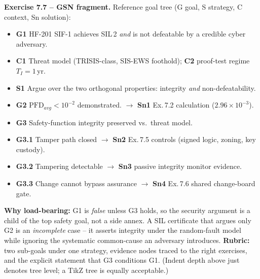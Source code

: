 \documentclass[11pt,a4paper]{article}
\begin{document}
\begin{solutionbox}
\textbf{Exercise 7.7 -- GSN fragment.}
Reference goal tree (G goal, S strategy, C context, Sn solution):
\begin{itemize}\setlength{\itemsep}{1pt}
  \item \textbf{G1} HF-201 SIF-1 achieves SIL\,2 \emph{and} is not defeatable
        by a credible cyber adversary.
  \item \quad\textbf{C1} Threat model (TRISIS-class, SIS-EWS foothold);
        \textbf{C2} proof-test regime $T_I=1\,$yr.
  \item \quad\textbf{S1} Argue over the two orthogonal properties: integrity
        \emph{and} non-defeatability.
  \item \qquad\textbf{G2} $\mathrm{PFD}_{avg}<10^{-2}$ demonstrated.
        $\to$ \textbf{Sn1} Ex.\,7.2 calculation ($2.96\times10^{-3}$).
  \item \qquad\textbf{G3} Safety-function integrity preserved vs.\ threat model.
  \item \qquad\quad\textbf{G3.1} Tamper path closed $\to$ \textbf{Sn2}
        Ex.\,7.5 controls (signed logic, zoning, key custody).
  \item \qquad\quad\textbf{G3.2} Tampering detectable $\to$ \textbf{Sn3}
        passive integrity monitor evidence.
  \item \qquad\quad\textbf{G3.3} Change cannot bypass assurance $\to$
        \textbf{Sn4} Ex.\,7.6 shared change-board gate.
\end{itemize}
\textbf{Why load-bearing:} G1 is \emph{false} unless G3 holds, so the security
argument is a child of the top safety goal, not a side annex. A SIL certificate
that argues only G2 is an \emph{incomplete} case -- it asserts integrity under
the random-fault model while ignoring the systematic common-cause an adversary
introduces.
\textbf{Rubric:} two sub-goals under one strategy, evidence nodes traced to the
right exercises, and the explicit statement that G3 conditions G1. (Indent
depth above just denotes tree level; a TikZ tree is equally acceptable.)
\end{solutionbox}
\end{document}
